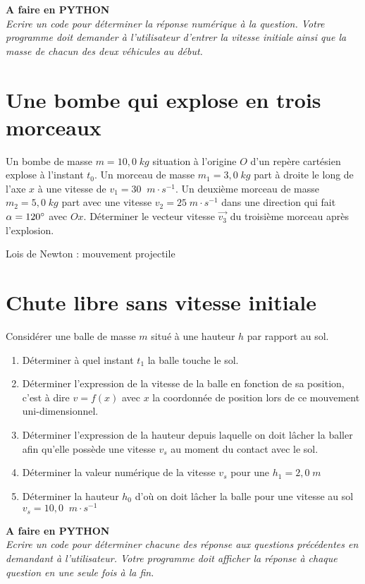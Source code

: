 \documentclass[11pt,a4paper]{article}
\newcommand{\mps}{\; m\cdot s^{-1}}
\newenvironment{python}
 {\begin{shaded} \textbf{A faire en PYTHON}\\ \itshape } { \end{shaded}}
\begin{document}
\begin{python}
Ecrire un code pour déterminer la réponse numérique à la question. Votre programme doit demander à l'utilisateur d'entrer la vitesse initiale ainsi que la masse de chacun des deux véhicules au début. \end{python}

\section{Une bombe qui explose en trois morceaux}
Un bombe de masse $m=10,0\; kg$ situation à l'origine $O$ d'un repère cartésien explose à l'instant $t_0$.    
Un morceau de masse $m_1=3,0 \; kg$ part à droite le long de l'axe $x$ à une vitesse de $v_1=30\; \mps$. 
Un deuxième morceau de masse $m_2 = 5,0 \; kg$ part avec une vitesse $v_2=25\mps$ dans une direction qui fait $\alpha=120\degree$ avec $Ox$. 
Déterminer le vecteur vitesse $\vec{v_3}$ du troisième morceau après l'explosion. 
\vspace{1cm}

\newpage

\noindent
\xrfill[0.7ex]{1pt} \quad Lois de Newton : mouvement projectile \quad \xrfill[0.7ex]{1pt}

\section{Chute libre sans vitesse initiale}
Considérer une balle de masse $m$ situé à une hauteur $h$ par rapport au sol. 
\begin{enumerate}
    \item Déterminer à quel instant $t_1$ la balle touche le sol.
    \item Déterminer l'expression de la vitesse de la balle en fonction de sa position, c'est à dire $v=f(x)$ avec $x$ la coordonnée de position lors de ce mouvement uni-dimensionnel. 
    \item Déterminer l'expression de la hauteur depuis laquelle on doit lâcher la baller afin qu'elle possède une vitesse $v_s$ au moment du contact avec le sol. 
    \item Déterminer la valeur numérique de la vitesse $v_s$ pour une $h_1=2,0\;  m$
    \item Déterminer la hauteur $h_0$ d'où on doit lâcher la balle pour une vitesse au sol $v_s = 10,0 \; \mps$
\end{enumerate}

\begin{python}
Ecrire un code pour déterminer chacune des réponse aux questions précédentes en demandant à l'utilisateur. 
Votre programme doit afficher la réponse à chaque question en une seule fois à la fin. 
\end{python}
\end{document}
